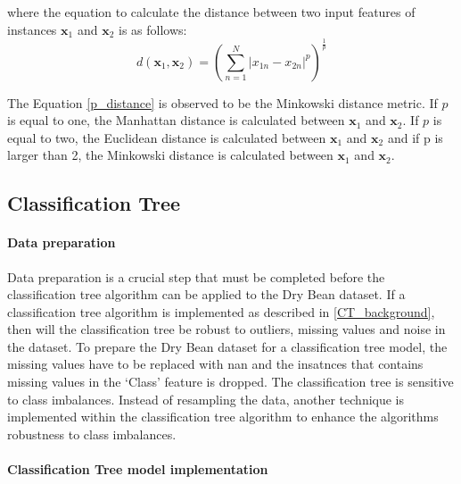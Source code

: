 \documentclass[10pt, conference]{IEEEtran}
\begin{document}
where the equation to calculate the distance between two input features of instances
$\boldsymbol{\textbf{x}}_1$ and $\boldsymbol{\textbf{x}}_2$ is as follows:
\begin{equation}
    d(\boldsymbol{\textbf{x}}_1, \boldsymbol{\textbf{x}}_2) = \left(\sum_{n=1}^{N} \left| x_{1n} - x_{2n} \right|^p\right)^\frac{1}{p} \label{p_distance}
\end{equation}

The Equation \eqref{p_distance} is observed to be the Minkowski distance metric. If $p$ is equal to one, the Manhattan
distance is calculated between $\boldsymbol{\textbf{x}}_1$ and $\boldsymbol{\textbf{x}}_2$. If $p$ is equal to two,
the Euclidean distance is calculated between $\boldsymbol{\textbf{x}}_1$ and $\boldsymbol{\textbf{x}}_2$ and if
p is larger than 2, the Minkowski distance is calculated between $\boldsymbol{\textbf{x}}_1$ and $\boldsymbol{\textbf{x}}_2$.

\subsection{Classification Tree}

\paragraph{Data preparation}

Data preparation is a crucial step that must be completed before the classification tree algorithm can be applied to the
Dry Bean dataset. If a classification tree algorithm is implemented as described in \ref{CT_background}, then will
the classification tree be robust to outliers, missing values and noise in the dataset.
To prepare the Dry Bean dataset for a classification tree model, the missing values have to be replaced
with \acrshort{nan} and the insatnces that contains missing values in the `Class' feature is dropped. The
classification tree is sensitive to class imbalances. Instead of resampling the data, another technique is implemented
within the classification tree algorithm to enhance the algorithms robustness to class imbalances.

\paragraph{Classification Tree model implementation}
\end{document}
